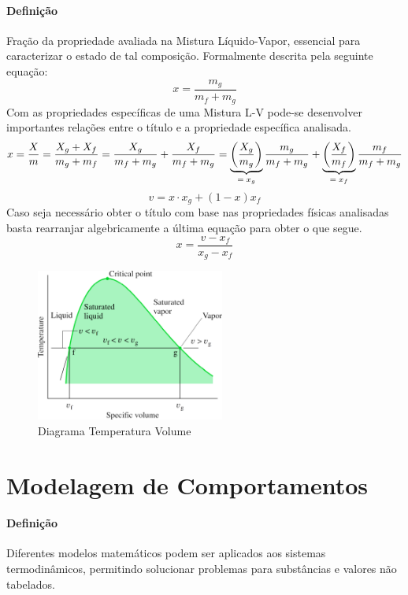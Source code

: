 \documentclass{article}
\begin{document}
            \paragraph{Definição}Fração da propriedade avaliada na Mistura Líquido-Vapor, essencial para caracterizar o estado de tal composição. Formalmente descrita pela seguinte equação:
                \[\boxed{x = \frac{m_{g}}{m_{f} + m_{g}}}\]
            Com as propriedades específicas de uma Mistura L-V pode-se desenvolver importantes relações entre o título e a propriedade específica analisada.
                \[x = \frac{X}{m}
                    = \frac{X_{g} + X_{f}}{m_{g} + m_{f}}
                    = \frac{X_{g}}{m_{f} + m_{g}} + \frac{X_{f}}{m_{f} + m_{g}}
                    = \underbrace{\left(\frac{X_{g}}{m_{g}}\right)}_{\text{$ = x_{g}$}} \frac{m_{g}}{m_{f} + m_{g}} + \underbrace{\left(\frac{X_{f}}{m_{f}}\right)}_{\text{$ = x_{f}$}} \frac{m_{f}}{m_{f} + m_{g}}\]
                \[\boxed{v = x \cdot x_{g}+(1-x)x_{f}}\]
            Caso seja necessário obter o título com base nas propriedades físicas analisadas basta rearranjar algebricamente a última equação para obter o que segue.
                \[\boxed{x = \frac{v - x_{f}}{x_{g} - x_{f}}}\]
                \begin{figure}[h]
                    \centering
                    \includegraphics[height = 5cm]{D. Tv.png}
                    \caption{Diagrama Temperatura Volume}
                \end{figure}
\newpage

    \section{Modelagem de Comportamentos}
        \paragraph{Definição}Diferentes modelos matemáticos podem ser aplicados aos sistemas termodinâmicos, permitindo solucionar problemas para substâncias e valores não tabelados.
\end{document}
